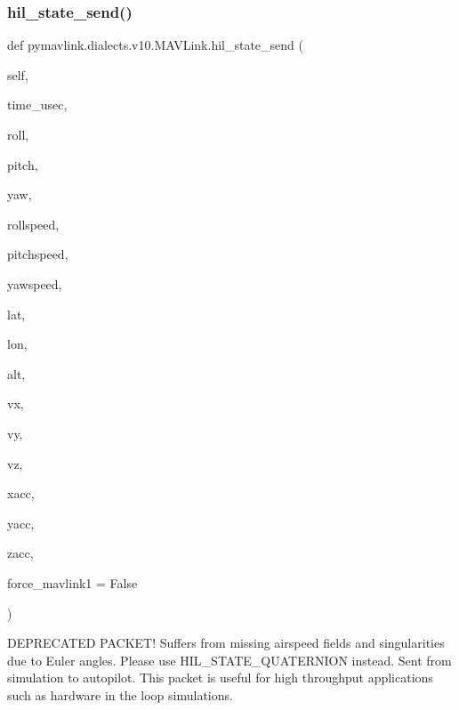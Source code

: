 \begin{DoxyVerb}
\begin{DoxyVerb}
\begin{DoxyVerb}
\begin{DoxyVerb}
\subsubsection{\texorpdfstring{hil\+\_\+state\+\_\+send()}{hil\_state\_send()}}
{\footnotesize\ttfamily def pymavlink.\+dialects.\+v10.\+M\+A\+V\+Link.\+hil\+\_\+state\+\_\+send (\begin{DoxyParamCaption}\item[{}]{self,  }\item[{}]{time\+\_\+usec,  }\item[{}]{roll,  }\item[{}]{pitch,  }\item[{}]{yaw,  }\item[{}]{rollspeed,  }\item[{}]{pitchspeed,  }\item[{}]{yawspeed,  }\item[{}]{lat,  }\item[{}]{lon,  }\item[{}]{alt,  }\item[{}]{vx,  }\item[{}]{vy,  }\item[{}]{vz,  }\item[{}]{xacc,  }\item[{}]{yacc,  }\item[{}]{zacc,  }\item[{}]{force\+\_\+mavlink1 = {\ttfamily False} }\end{DoxyParamCaption})}

\begin{DoxyVerb}DEPRECATED PACKET! Suffers from missing airspeed fields and
singularities due to Euler angles. Please use
HIL_STATE_QUATERNION instead. Sent from simulation to
autopilot. This packet is useful for high throughput
applications such as hardware in the loop simulations.


\end{DoxyVerb}
\end{DoxyVerb}
\end{DoxyVerb}
\end{DoxyVerb}
\end{DoxyVerb}
